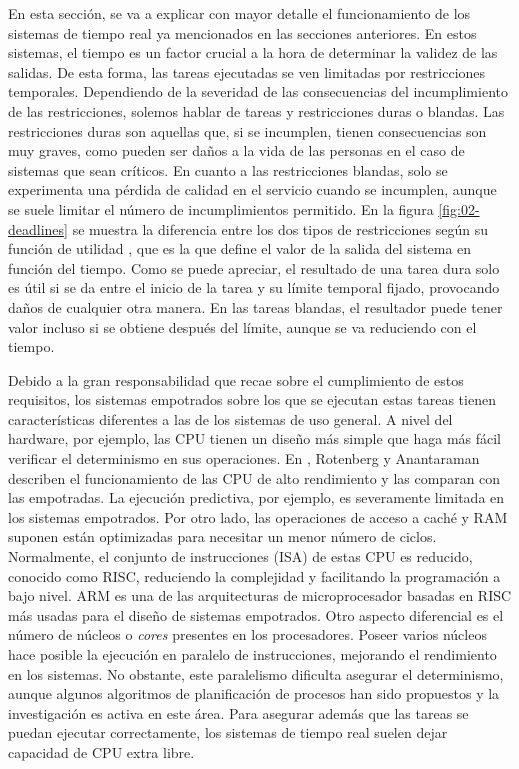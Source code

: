 En esta sección, se va a explicar con mayor detalle el funcionamiento de los
sistemas de tiempo real ya mencionados en las secciones anteriores. En estos
sistemas, el tiempo es un factor crucial a la hora de determinar la validez de
las salidas. De esta forma, las tareas ejecutadas se ven limitadas por
restricciones temporales. Dependiendo de la severidad de las consecuencias del
incumplimiento de las restricciones, solemos hablar de tareas y restricciones
duras o blandas. Las restricciones duras son aquellas que, si se incumplen,
tienen consecuencias son muy graves, como pueden ser daños a la vida de las
personas en el caso de sistemas que sean críticos. En cuanto a las restricciones
blandas, solo se experimenta una pérdida de calidad en el servicio cuando se
incumplen, aunque se suele limitar el número de incumplimientos permitido. En la
figura \ref{fig:02-deadlines} se muestra la diferencia entre los dos tipos de
restricciones según su función de utilidad \cite{wang_introduction_2013}, que es
la que define el valor de la salida del sistema en función del tiempo. Como se
puede apreciar, el resultado de una tarea dura solo es útil si se da entre el
inicio de la tarea y su límite temporal fijado, provocando daños de cualquier
otra manera. En las tareas blandas, el resultador puede tener valor incluso si
se obtiene después del límite, aunque se va reduciendo con el tiempo.

Debido a la gran responsabilidad que recae sobre el cumplimiento de estos
requisitos, los sistemas empotrados sobre los que se ejecutan estas tareas
tienen características diferentes a las de los sistemas de uso general. A nivel
del hardware, por ejemplo, las CPU tienen un diseño más simple que haga más
fácil verificar el determinismo en sus operaciones. En
\cite{rotenberg_chapter_2005}, Rotenberg y Anantaraman describen el
funcionamiento de las CPU de alto rendimiento y las comparan con las empotradas.
La ejecución predictiva, por ejemplo, es severamente limitada en los sistemas
empotrados. Por otro lado, las operaciones de acceso a caché y RAM suponen están
optimizadas para necesitar un menor número de ciclos. Normalmente, el conjunto
de instrucciones (ISA) de estas CPU es reducido, conocido como RISC, reduciendo
la complejidad y facilitando la programación a bajo nivel. ARM es una de las
arquitecturas de microprocesador basadas en RISC más usadas para el diseño de
sistemas empotrados. Otro aspecto diferencial es el número de núcleos o
\textit{cores} presentes en los procesadores. Poseer varios núcleos hace posible
la ejecución en paralelo de instrucciones, mejorando el rendimiento en los
sistemas. No obstante, este paralelismo dificulta asegurar el determinismo,
aunque algunos algoritmos de planificación de procesos han sido propuestos
\cite{anderson_edf-based_2005} y la investigación es activa en este área. Para
asegurar además que las tareas se puedan ejecutar correctamente, los sistemas de
tiempo real suelen dejar capacidad de CPU extra libre.

